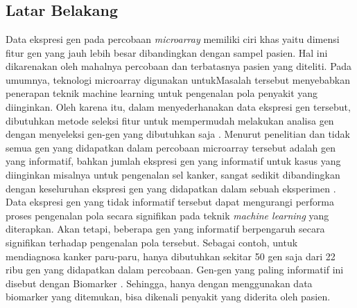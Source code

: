 \chapter{\babSatu}

\section{Latar Belakang}
Data ekspresi gen pada percobaan \textit{microarray} memiliki ciri khas yaitu dimensi fitur gen yang jauh lebih besar dibandingkan dengan sampel pasien. Hal ini dikarenakan oleh mahalnya percobaan dan terbatasnya pasien yang diteliti. Pada umumnya, teknologi microarray digunakan untukMasalah tersebut menyebabkan penerapan teknik machine learning untuk pengenalan pola penyakit yang diinginkan. Oleh karena itu, dalam menyederhanakan data ekspresi gen tersebut, dibutuhkan metode seleksi fitur untuk mempermudah melakukan analisa gen dengan menyeleksi gen-gen yang dibutuhkan saja \citep{yoon2006building}. Menurut penelitian \cite{yoon2006building} dan \cite{bandyopadhyay2014survey} tidak semua gen yang didapatkan dalam percobaan microarray tersebut adalah gen yang informatif, bahkan jumlah ekspresi gen yang informatif untuk kasus yang diinginkan misalnya untuk pengenalan sel kanker, sangat sedikit dibandingkan dengan keseluruhan ekspresi gen yang didapatkan dalam sebuah eksperimen \citep{bandyopadhyay2014survey}. Data ekspresi gen yang tidak informatif tersebut dapat mengurangi performa  proses pengenalan pola secara signifikan pada teknik \textit{machine learning} yang diterapkan. Akan tetapi, beberapa gen yang informatif berpengaruh secara signifikan terhadap pengenalan pola tersebut. Sebagai contoh, untuk mendiagnosa kanker paru-paru, hanya dibutuhkan sekitar 50 gen saja dari 22 ribu gen yang didapatkan dalam percobaan. Gen-gen yang paling informatif ini disebut dengan Biomarker \citep{belinsky2004gene}. Sehingga, hanya dengan menggunakan data biomarker yang ditemukan, bisa dikenali penyakit yang diderita oleh pasien.\\

